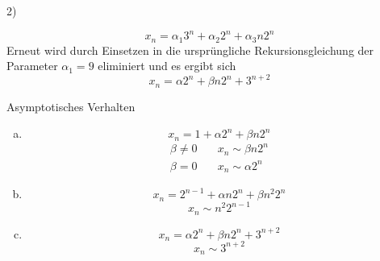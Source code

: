 \begin{paragraph}{2)}
\begin{enumerate}[(a)]
      \[ x_{n} = \alpha_{1}3^{n} + \alpha_{2}2^{n} + \alpha_{3}n2^{n} \]
      Erneut wird durch Einsetzen in die ursprüngliche Rekursionsgleichung der
      Parameter $\alpha_{1} = 9$ eliminiert und es ergibt sich
      \[ x_{n} = \alpha 2^{n} + \beta n2^{n} + 3^{n+2} \]
  \end{enumerate}
  \begin{subparagraph}{Asymptotisches Verhalten}
    \begin{enumerate}[(a)]
      \item \[ x_{n} = 1 + \alpha 2^{n} + \beta n2^{n} \]
        \begin{equation*}
          \begin{split}
           \beta \not= 0 &\quad x_{n} \sim \beta n2^{n} \\
           \beta = 0     &\quad x_{n} \sim \alpha 2^{n}
          \end{split}
        \end{equation*}
      \item \[ x_{n} = 2^{n-1} + \alpha n2^{n} + \beta n^{2}2^{n}\]
        \[ x_{n} \sim n^{2}2^{n-1} \]
      \item \[ x_{n} = \alpha 2^{n} + \beta n2^{n} + 3^{n+2} \]
        \[ x_{n} \sim 3^{n+2} \]
    \end{enumerate}
  \end{subparagraph}
\end{paragraph}
